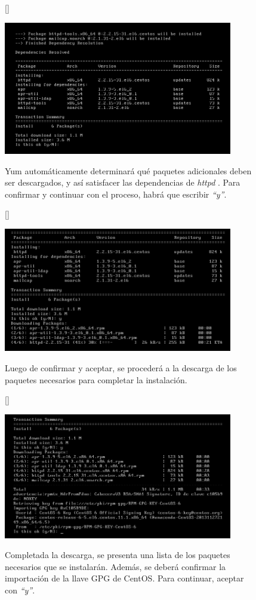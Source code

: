 \documentclass[11pt]{article}
\begin{document}
\begin{figure}[ht]
[\FBwidth]
{\caption{Yum automáticamente determinará qué paquetes adicionales deben ser descargados,  y así satisfacer las dependencias de \textit{httpd} . Para confirmar y continuar con el proceso, habrá que escribir \textit{``y''}.}\label{fig:dependencias}}
{\includegraphics[width=10cm]{screenshots/httpd-install/lista-dependencias.png}}
\end{figure}


\begin{figure}[ht]
[\FBwidth]
{\caption{Luego de confirmar y aceptar, se procederá a la descarga de los paquetes necesarios para completar la instalación.}\label{fig:descargando}}
{\includegraphics[width=10cm]{screenshots/httpd-install/descargando-paquetes.png}}
\end{figure}

\begin{figure}[ht]
[\FBwidth]
{\caption{Completada la descarga, se presenta una lista de los paquetes necesarios que se instalarán. Además, se deberá confirmar la importación de la llave GPG de CentOS. Para continuar, aceptar con \textit{``y''}.}\label{fig:gpgKey}}
{\includegraphics[width=10cm]{screenshots/httpd-install/aceptar-gpg-key.png}}
\end{figure}
\end{document}

